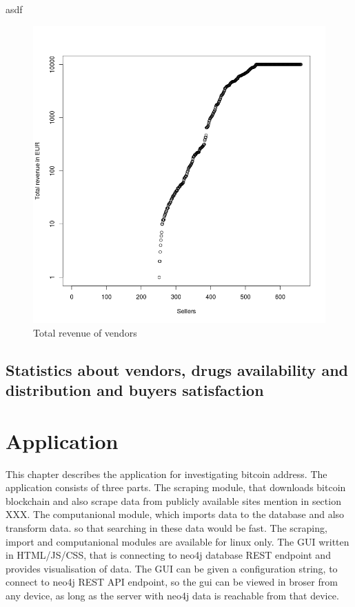 \documentclass[
  digital, %
  table,   %
  lof,     %
  lot,     %
  oneside
]{fithesis3}
\begin{document}
asdf
\begin{figure}[!htb]
    \centering
    \includegraphics[scale=0.4]{total-rev}
    \caption{Total revenue of vendors}
    \label{Vendors by total revenue}
\end{figure}

\section{Statistics about vendors, drugs availability and distribution and buyers satisfaction}



\chapter{Application}

This chapter describes the application for investigating bitcoin address.
The application consists of three parts.
The scraping module, that downloads bitcoin blockchain and also scrape data from publicly available sites mention in section XXX.
The computanional module, which imports data to the database and also transform data. so that searching in these data would be fast.
The scraping, import and computanional modules are available for linux only.
The GUI written in HTML/JS/CSS, that is connecting to neo4j database REST endpoint and provides visualisation of data.
The GUI can be given a configuration string, to connect to neo4j REST API endpoint, so the gui can be viewed in broser from any device, as long as 
the server with neo4j data is reachable from that device.
\end{document}
